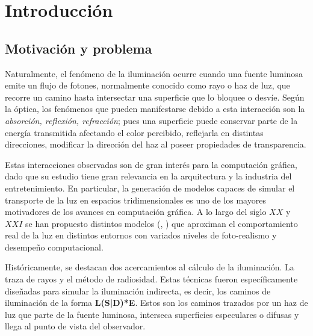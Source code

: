 \chapter{Introducción}
\label{ch:chap01}




\section{Motivación y problema}
\label{sec:motivacionYProblemas}

Naturalmente, el fenómeno de la iluminación ocurre cuando una fuente luminosa emite un flujo de fotones, normalmente conocido como rayo o haz de luz, que recorre un camino hasta intersectar una superficie que lo bloquee o desvíe. Según la óptica, los fenómenos que pueden manifestarse debido a esta interacción son la \textit{absorción, reflexión, refracción}; pues una superficie puede conservar parte de la energía transmitida afectando el color percibido, reflejarla en distintas direcciones, modificar la dirección del haz al poseer propiedades de transparencia.

Estas interacciones observadas son de gran interés para la computación gráfica, dado que su estudio tiene gran relevancia en la arquitectura y la industria del entretenimiento. En particular, la generación de modelos capaces de simular el transporte de la luz en espacios tridimensionales es uno de los mayores motivadores de los avances en computación gráfica. A lo largo del siglo $XX$ y $XXI$ se han propuesto distintos modelos (\cite{Kajiya}, \cite{Cohen}) que aproximan el comportamiento real de la luz en distintos entornos con variados niveles de foto-realismo y desempeño computacional.

Históricamente, se destacan dos acercamientos al cálculo de la iluminación. La traza de rayos y el método de radiosidad. Estas técnicas fueron específicamente diseñadas para simular la iluminación indirecta, es decir, los caminos de iluminación de la forma \textbf{L(S|D)*E}. Estos son los caminos trazados por un haz de luz que parte de la fuente luminosa, interseca superficies especulares o difusas y llega al punto de vista del observador. 

